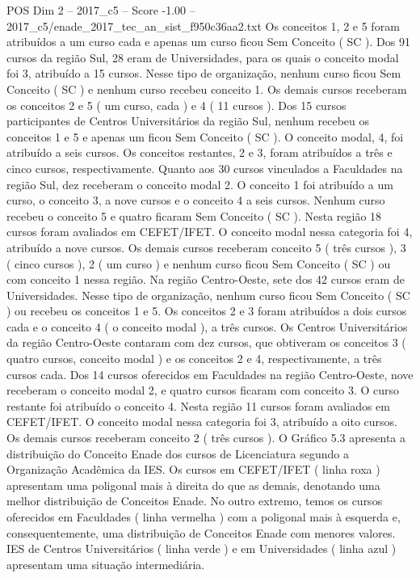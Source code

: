 \begin{textsample}{POS Dim 2 – 2017\_c5 – Score -1.00 – 2017\_c5/enade\_2017\_tec\_an\_sist\_f950c36aa2.txt}
Os conceitos 1, 2 e 5 foram atribuídos a um curso cada e apenas um curso ficou Sem Conceito ( SC ).
Dos 91 cursos da região Sul, 28 eram de Universidades, para os quais o conceito modal foi 3, atribuído a 15 cursos.
Nesse tipo de organização, nenhum curso ficou Sem Conceito ( SC ) e nenhum curso recebeu conceito 1.
Os demais cursos receberam os conceitos 2 e 5 ( um curso, cada ) e 4 ( 11 cursos ).
Dos 15 cursos participantes de Centros Universitários da região Sul, nenhum recebeu os conceitos 1 e 5 e apenas um ficou Sem Conceito ( SC ).
O conceito modal, 4, foi atribuído a seis cursos.
Os conceitos restantes, 2 e 3, foram atribuídos a três e cinco cursos, respectivamente.
Quanto aos 30 cursos vinculados a Faculdades na região Sul, dez receberam o conceito modal 2.
O conceito 1 foi atribuído a um curso, o conceito 3, a nove cursos e o conceito 4 a seis cursos.
Nenhum curso recebeu o conceito 5 e quatro ficaram Sem Conceito ( SC ).
Nesta região 18 cursos foram avaliados em CEFET/IFET.
O conceito modal nessa categoria foi 4, atribuído a nove cursos.
Os demais cursos receberam conceito 5 ( três cursos ), 3 ( cinco cursos ), 2 ( um curso ) e nenhum curso ficou Sem Conceito ( SC ) ou com conceito 1 nessa região.
Na região Centro-Oeste, sete dos 42 cursos eram de Universidades.
Nesse tipo de organização, nenhum curso ficou Sem Conceito ( SC ) ou recebeu os conceitos 1 e 5.
Os conceitos 2 e 3 foram atribuídos a dois cursos cada e o conceito 4 ( o conceito modal ), a três cursos.
Os Centros Universitários da região Centro-Oeste contaram com dez cursos, que obtiveram os conceitos 3 ( quatro cursos, conceito modal ) e os conceitos 2 e 4, respectivamente, a três cursos cada.
Dos 14 cursos oferecidos em Faculdades na região Centro-Oeste, nove receberam o conceito modal 2, e quatro cursos ficaram com conceito 3.
O curso restante foi atribuído o conceito 4.
Nesta região 11 cursos foram avaliados em CEFET/IFET.
O conceito modal nessa categoria foi 3, atribuído a oito cursos.
Os demais cursos receberam conceito 2 ( três cursos ).
O Gráfico 5.3 apresenta a distribuição do Conceito Enade dos cursos de Licenciatura segundo a Organização Acadêmica da IES.
Os cursos em CEFET/IFET ( linha roxa ) apresentam uma poligonal mais à direita do que as demais, denotando uma melhor distribuição de Conceitos Enade.
No outro extremo, temos os cursos oferecidos em Faculdades ( linha vermelha ) com a poligonal mais à esquerda e, consequentemente, uma distribuição de Conceitos Enade com menores valores.
IES de Centros Universitários ( linha verde ) e em Universidades ( linha azul ) apresentam uma situação intermediária.

\end{textsample}
